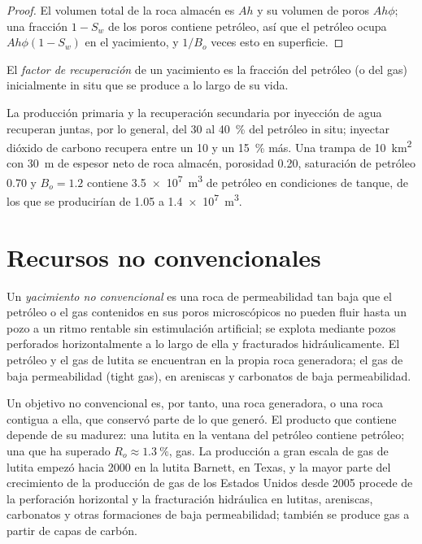 \begin{proof}
El volumen total de la roca almacén es $Ah$ y su volumen de poros $Ah\phi$; una fracción $1 - S_w$ de los
poros contiene petróleo, así que el petróleo ocupa $Ah\phi(1 - S_w)$ en el yacimiento, y $1/B_o$ veces esto en
superficie.
\end{proof}

\begin{definition}\label{def:b2:energy-geology:volumetrics}
El \emph{factor de recuperación} de un yacimiento es la fracción del petróleo (o del gas)
inicialmente in situ que se produce a lo largo de su vida.
\end{definition}

La producción primaria y la recuperación secundaria por inyección de agua recuperan juntas, por lo general, del 30 al \qty{40}{\percent} del petróleo in situ; inyectar dióxido
de carbono recupera entre un 10 y un \qty{15}{\percent} más. Una trampa de \qty{10}{km^2} con \qty{30}{m} de espesor neto de
roca almacén, porosidad 0.20, saturación de petróleo 0.70 y $B_o = 1.2$ contiene \qty{3.5e7}{m^3} de petróleo
en condiciones de tanque, de los que se producirían de 1.05 a \qty{1.4e7}{m^3}.

\section{Recursos no convencionales}\label{sec:b2:energy-geology:unconventional}

\begin{definition}\label{def:b2:energy-geology:unconventional}
Un \emph{yacimiento no convencional} es una roca de permeabilidad tan
baja que el petróleo o el gas contenidos en sus poros microscópicos no pueden fluir hasta un pozo a un ritmo
rentable sin estimulación artificial; se explota mediante pozos perforados horizontalmente a lo largo de ella y
fracturados hidráulicamente. El petróleo y el gas de lutita se encuentran en la propia roca generadora; el gas de baja permeabilidad (tight gas),
en areniscas y carbonatos de baja permeabilidad.
\end{definition}

Un objetivo no convencional es, por tanto, una roca generadora, o una roca contigua a ella, que conservó parte de lo que
generó. El producto que contiene depende de su madurez: una lutita en la ventana del petróleo contiene petróleo;
una que ha superado $R_o \approx \qty{1.3}{\percent}$, gas. La producción a gran escala de gas de lutita empezó hacia
2000 en la lutita Barnett, en Texas, y la mayor parte del crecimiento de la producción de gas de los Estados Unidos desde
2005 procede de la perforación horizontal y la fracturación hidráulica en lutitas, areniscas, carbonatos y
otras formaciones de baja permeabilidad; también se produce gas a partir de capas de carbón.

